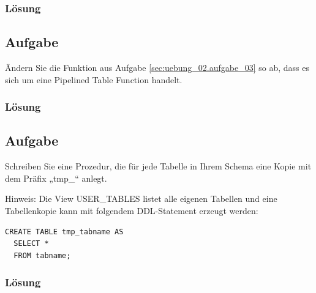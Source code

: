 \subsubsection*{Lösung}
\label{sec:uebung_02.aufgabe_03.loesung}


\subsection{Aufgabe}
\label{sec:uebung_02.aufgabe_04}
Ändern Sie die Funktion aus Aufgabe \ref{sec:uebung_02.aufgabe_03} so ab, dass es sich um eine Pipelined Table Function handelt.

\subsubsection*{Lösung}
\label{sec:uebung_02.aufgabe_04.loesung}


\subsection{Aufgabe}
\label{sec:uebung_02.aufgabe_05}
Schreiben Sie eine Prozedur, die für jede Tabelle in Ihrem Schema eine Kopie mit dem Präfix „tmp\_“ anlegt.

Hinweis: Die View USER\_TABLES listet alle eigenen Tabellen und eine Tabellenkopie kann mit folgendem DDL-Statement erzeugt werden:
\begin{verbatim}
CREATE TABLE tmp_tabname AS
  SELECT *
  FROM tabname;
\end{verbatim}

\subsubsection*{Lösung}
\label{sec:uebung_02.aufgabe_05.loesung}


